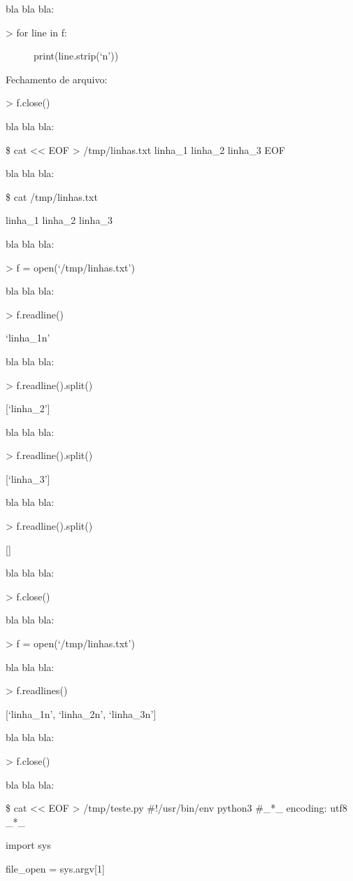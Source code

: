 \documentclass[letterpaper,10pt,brazil]{sphinxmanual}
\begin{document}
bla bla bla:
\begin{description}
\item[{\textgreater{} for line in f:}] \leavevmode
print(line.strip(‘n’))

\end{description}

Fechamento de arquivo:

\textgreater{} f.close()

bla bla bla:

\$ cat \textless{}\textless{} EOF \textgreater{} /tmp/linhas.txt
linha\_1
linha\_2
linha\_3
EOF

bla bla bla:

\$ cat /tmp/linhas.txt

linha\_1
linha\_2
linha\_3

bla bla bla:

\textgreater{} f = open(‘/tmp/linhas.txt’)

bla bla bla:

\textgreater{} f.readline()

‘linha\_1n’

bla bla bla:

\textgreater{} f.readline().split()

{[}‘linha\_2’{]}

bla bla bla:

\textgreater{} f.readline().split()

{[}‘linha\_3’{]}

bla bla bla:

\textgreater{} f.readline().split()

{[}{]}

bla bla bla:

\textgreater{} f.close()

bla bla bla:

\textgreater{} f = open(‘/tmp/linhas.txt’)

bla bla bla:

\textgreater{} f.readlines()

{[}‘linha\_1n’, ‘linha\_2n’, ‘linha\_3n’{]}

bla bla bla:

\textgreater{} f.close()

bla bla bla:

\$ cat \textless{}\textless{} EOF \textgreater{} /tmp/teste.py
\#!/usr/bin/env python3
\#\_*\_ encoding: utf8 \_*\_

import sys

file\_open = sys.argv{[}1{]}
\end{document}
